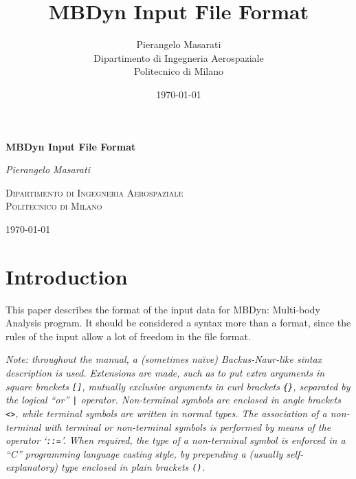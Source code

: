 \documentclass[10pt,dvips]{report}
\begin{document}
\begin{latexonly}
\title{\bf MBDyn Input File Format}
\author{Pierangelo Masarati \vspace{5mm}\\
    \sc Dipartimento di Ingegneria Aerospaziale \\
    \sc Politecnico di Milano}
\date{\today}
\maketitle
\end{latexonly}

\begin{htmlonly}
\begin{center}
\textbf{\LARGE MBDyn Input File Format}

\emph{\large Pierangelo Masarati}

\textsc{Dipartimento di Ingegneria Aerospaziale \\ Politecnico di Milano}

\today
\end{center}
\end{htmlonly}




\tableofcontents
\newpage

\chapter{Introduction}
This paper describes the format of the input data for MBDyn: 
Multi-body Analysis program.
It should be considered a syntax more than a format, since the rules of the
input allow a lot of freedom in the file format. 

\vspace{10mm}%
\emph{
Note: throughout the manual, a (sometimes na\"{\i}ve) 
Backus-Naur-like sintax description is used. 
Extensions are made, such as to put extra arguments in square brackets
\texttt{[]}, mutually exclusive arguments in curl brackets \texttt{\{\}},
separated by the logical ``or'' \texttt{|} operator.
Non-terminal symbols are enclosed in angle brackets \texttt{<>}, while
terminal symbols are written in normal types.
The association of a non-terminal with terminal or non-terminal
symbols is performed by means of the operator `\texttt{::=}'. 
When required, the type of a non-terminal symbol is enforced in a ``C''
programming language casting style, by prepending a (usually
self-explanatory) type enclosed in plain brackets \texttt{()}.
}




\end{document}
